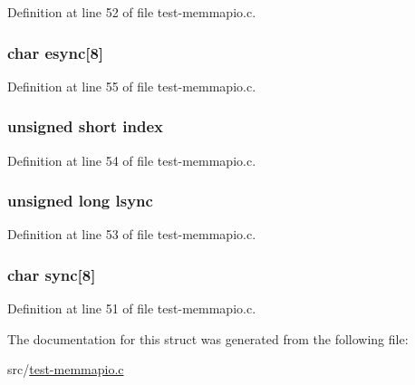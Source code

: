 Definition at line 52 of file test-\/memmapio.\-c.

\hypertarget{struct___t_e_s_t_a___r_e_c_ada0ff0fb7bd89f61b5bbf3d51a56a5ce}{
\subsubsection[{esync}]{\setlength{\rightskip}{0pt plus 5cm}char esync\mbox{[}8\mbox{]}}}\label{struct___t_e_s_t_a___r_e_c_ada0ff0fb7bd89f61b5bbf3d51a56a5ce}


Definition at line 55 of file test-\/memmapio.\-c.

\hypertarget{struct___t_e_s_t_a___r_e_c_aeea7950719aa0c034360149db761ae52}{
\subsubsection[{index}]{\setlength{\rightskip}{0pt plus 5cm}unsigned short index}}\label{struct___t_e_s_t_a___r_e_c_aeea7950719aa0c034360149db761ae52}


Definition at line 54 of file test-\/memmapio.\-c.

\hypertarget{struct___t_e_s_t_a___r_e_c_a7173bc263294f95c40c8bc5aab49a914}{
\subsubsection[{lsync}]{\setlength{\rightskip}{0pt plus 5cm}unsigned long lsync}}\label{struct___t_e_s_t_a___r_e_c_a7173bc263294f95c40c8bc5aab49a914}


Definition at line 53 of file test-\/memmapio.\-c.

\hypertarget{struct___t_e_s_t_a___r_e_c_adb9f0b7ac1cc6c4d8ffbaf504da8a1f1}{
\subsubsection[{sync}]{\setlength{\rightskip}{0pt plus 5cm}char sync\mbox{[}8\mbox{]}}}\label{struct___t_e_s_t_a___r_e_c_adb9f0b7ac1cc6c4d8ffbaf504da8a1f1}


Definition at line 51 of file test-\/memmapio.\-c.



The documentation for this struct was generated from the following file\-:\begin{DoxyCompactItemize}
\item 
src/\hyperlink{test-memmapio_8c}{test-\/memmapio.\-c}\end{DoxyCompactItemize}
